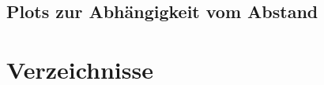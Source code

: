 \documentclass[slug=CS, room=Andreas-Schubert-Bau\,\ Labor\ 406,
supervisor=Juliane\ Volkmer, coursedate=29.\ 11.\ 2019]{../../Lab_Report_LaTeX/lab_report}
\begin{document}
\begin{figure}[H]\centering
  
  \caption{}
  \label{fig:dicke-6}
\end{figure}

\begin{figure}[H]\centering
  
  \caption{}
  \label{fig:dicke-10}
\end{figure}

\begin{figure}[H]\centering
  
  \caption{}
  \label{fig:dicke-20}
\end{figure}

\subsection{Plots zur Abh\"angigkeit vom Abstand}
\label{sec:anabplot}

\begin{figure}[H]\centering
  
  \caption{}
  \label{fig:dists-7}
\end{figure}

\begin{figure}[H]\centering
  
  \caption{}
  \label{fig:dists-9}
\end{figure}

\begin{figure}[H]\centering
  
  \caption{}
  \label{fig:dists-12}
\end{figure}

\section{Verzeichnisse}

\label{sec:literatur}

\listoffigures

\listoftables

\printbibliography
\end{document}
